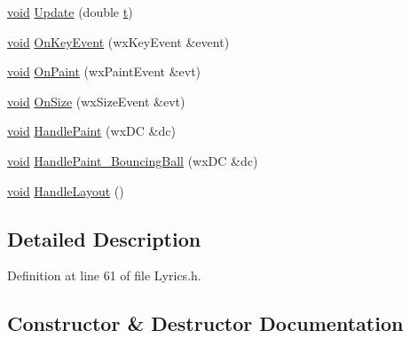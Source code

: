 \begin{DoxyCompactItemize}
\item 
\hyperlink{sound_8c_ae35f5844602719cf66324f4de2a658b3}{void} \hyperlink{class_lyrics_a1a3f7ded50fbbbf5476ba13ff50bba21}{Update} (double \hyperlink{octave__test_8m_aaccc9105df5383111407fd5b41255e23}{t})
\item 
\hyperlink{sound_8c_ae35f5844602719cf66324f4de2a658b3}{void} \hyperlink{class_lyrics_a09eed60dd30269a498d2a0d9e95d860e}{On\+Key\+Event} (wx\+Key\+Event \&event)
\item 
\hyperlink{sound_8c_ae35f5844602719cf66324f4de2a658b3}{void} \hyperlink{class_lyrics_a91f125733c01cd66fde1c22d66ba0e63}{On\+Paint} (wx\+Paint\+Event \&evt)
\item 
\hyperlink{sound_8c_ae35f5844602719cf66324f4de2a658b3}{void} \hyperlink{class_lyrics_af10cbd70e788faf9ef457042f0833230}{On\+Size} (wx\+Size\+Event \&evt)
\item 
\hyperlink{sound_8c_ae35f5844602719cf66324f4de2a658b3}{void} \hyperlink{class_lyrics_a9bd5601bef046acd6b6112cb7b5228ec}{Handle\+Paint} (wx\+DC \&dc)
\item 
\hyperlink{sound_8c_ae35f5844602719cf66324f4de2a658b3}{void} \hyperlink{class_lyrics_a3c1b172f768750b915a0acfb74a2b74e}{Handle\+Paint\+\_\+\+Bouncing\+Ball} (wx\+DC \&dc)
\item 
\hyperlink{sound_8c_ae35f5844602719cf66324f4de2a658b3}{void} \hyperlink{class_lyrics_a67254e549e666d01671edd3d7bb0cc21}{Handle\+Layout} ()
\end{DoxyCompactItemize}


\subsection{Detailed Description}


Definition at line 61 of file Lyrics.\+h.



\subsection{Constructor \& Destructor Documentation}
